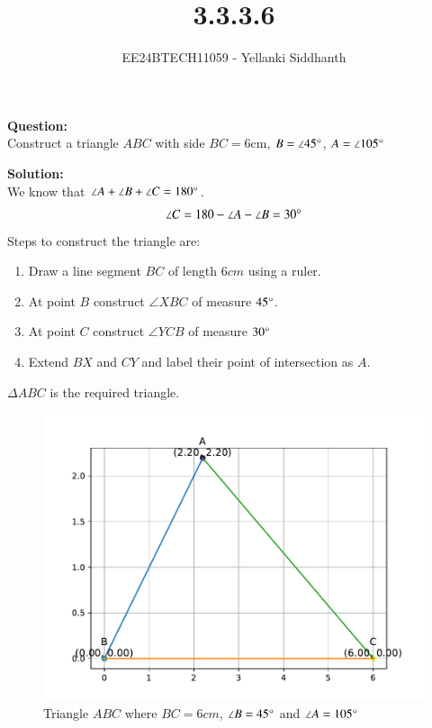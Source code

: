 \documentclass[journal]{IEEEtran}
\begin{document}
	
	
	\vspace{3cm}
	
	\title{3.3.3.6}
	\author{EE24BTECH11059 - Yellanki Siddhanth
	}
	{\let\newpage\relax\maketitle}
	
	\renewcommand{\thefigure}{\theenumi}
	\renewcommand{\thetable}{\theenumi}
	\setlength{\intextsep}{10pt} %
	
	
	\renewcommand{\thetable}{\theenumi}
	
\textbf{Question: }\\
Construct a triangle $ABC$ with side $BC = 6$cm, $B = \angle45\degree$, $A = \angle105\degree$

\textbf{Solution: } \\
We know that $ \angle A + \angle B + \angle C = 180\degree $.\\
	\begin{align}
		\angle C = 180 - \angle A - \angle B = 30\degree
	\end{align}
	Steps to construct the triangle are:
	\begin{enumerate}
		\item Draw a line segment $BC$ of length $6cm$ using a ruler.
		\item At point $B$ construct $\angle XBC$ of measure $45 \degree$.
		\item At point $C$ construct $\angle YCB$ of measure $30 \degree$
		\item Extend $BX$ and $CY$ and label their point of intersection as $A$.
	\end{enumerate} 
	
	$\Delta ABC$ is the required triangle.
	\begin{figure}[h!]
		\centering
		\includegraphics[width=0.7\linewidth]{figs/fig.pdf}
		\caption{Triangle $ABC$ where $BC=6cm$, $\angle B = 45 \degree$ and $\angle A = 105 \degree$}
	\end{figure}
	
	
\end{document}

